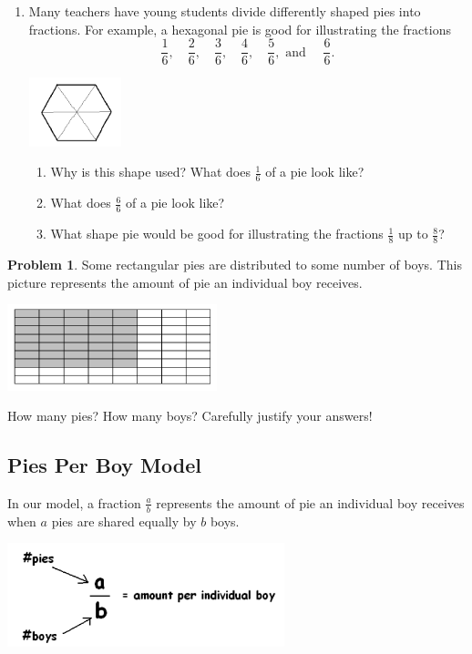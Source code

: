 \documentclass[10pt, reqno]{amsart}
\theoremstyle{remark}
\theoremstyle{definition}
\newtheorem{problem}{Problem}
\numberwithin{equation}{section}  %
\begin{document}
\begin{enumerate}
\item
Many teachers have young students divide differently shaped pies
into fractions. For example, a hexagonal pie is good for illustrating the fractions
\[
\frac 1 6, \quad
\frac 2 6, \quad
\frac 3 6, \quad
\frac 4 6, \quad
\frac 5 6, \text{ and }\quad
\frac 6 6.
\]

\begin{center}
\includegraphics[height = 2cm]{hexpie}
\end{center}


\begin{enumerate}
\item
Why is this shape used?  What does $\frac 1 6$ of a pie look like?

\item
What does $\frac 6 6 $ of a pie look like?

\item
What shape pie would be good for illustrating the fractions $\frac 1 8 $ up to $\frac 8 8$?
\end{enumerate}

 \end{enumerate}
 
 
 
 
 \begin{problem}
 Some rectangular pies are distributed to some number of boys. This picture
represents the amount of pie an individual boy receives.
 \begin{center}
\includegraphics[height = 2.5cm]{rectpie}
\end{center}
 How many pies?  How many boys?  Carefully justify your answers!
 
 \end{problem}
 
 
 
 
\subsection{Pies Per Boy Model}
In our model, a fraction
$\frac a b$ represents the amount of pie an individual boy
receives when $a$ pies are shared equally by  $b$ boys.
  \begin{center}
\includegraphics[height = 3cm]{PPBmodel}
\end{center}
\end{document}
